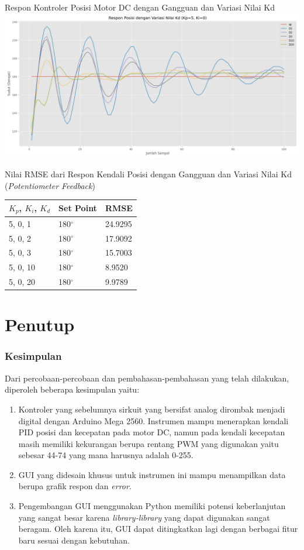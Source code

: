 \documentclass[10pt,xcolor={dvipsnames}]{beamer}
\begin{document}
\begin{frame}{Respon Kontroler Posisi Motor DC dengan Gangguan dan Variasi Nilai Kd}
	\centering
	\includegraphics[width=14cm]{Graph/VariasiD.png}
\end{frame}
\begin{frame}{Nilai RMSE dari Respon Kendali Posisi dengan Gangguan dan Variasi Nilai Kd (\textit{Potentiometer Feedback})}
	\begin{table}[H] 
		\begin{tabular}{| m{3cm} | m{3cm}| m{3cm}|}
			\hline
			\textbf{$K_{p}$, $K_{i}$, $K_{d}$}	& \textbf{Set Point}	& \textbf{RMSE}\\
			\hline 
			5, 0, 1	& 180$^\circ$			& 24.9295\\
			5, 0, 2 & 180$^\circ$			& 17.9092\\
			5, 0, 3 & 180$^\circ$			& 15.7003\\
			5, 0, 10 & 180$^\circ$			& 8.9520\\
			5, 0, 20 & 180$^\circ$			& 9.9789\\
			\hline
		\end{tabular}
	\end{table}
\end{frame}

\section{Penutup}
		\begin{frame}
			\frametitle{Kesimpulan}
			Dari percobaan-percobaan dan pembahasan-pembahasan yang telah dilakukan, diperoleh beberapa kesimpulan yaitu:
			\begin{enumerate}
				\item Kontroler yang sebelumnya sirkuit yang bersifat analog dirombak menjadi digital dengan Arduino Mega 2560. Instrumen mampu menerapkan kendali PID posisi dan kecepatan pada motor DC, namun pada kendali kecepatan masih memiliki kekurangan berupa rentang PWM yang digunakan yaitu sebesar 44-74 yang mana harusnya adalah 0-255.
				\item GUI yang didesain khusus untuk instrumen ini mampu menampilkan data berupa grafik respon dan \textit{error}.
				\item Pengembangan GUI menggunakan Python memiliki potensi keberlanjutan yang sangat besar karena \textit{library-library} yang dapat digunakan sangat beragam. Oleh karena itu, GUI dapat ditingkatkan lagi dengan berbagai fitur baru sesuai dengan kebutuhan.
			\end{enumerate}
		\end{frame}
		
\end{document}
